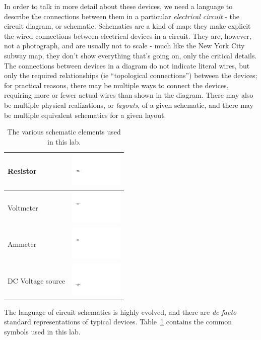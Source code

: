 \documentclass[12pt]{article}
\begin{document}
In order to talk in more detail about these devices, we need a
language to describe the connections between them in a particular
\textit{electrical circuit} - the circuit diagram, or schematic.
Schematics are a kind of map: they make explicit the wired connections
between electrical devices in a circuit.  They are, however, not a
photograph, and are usually not to scale - much like the New York City
subway map, they don't show everything that's going on, only the
critical details.  The connections between devices in a diagram do not
indicate literal wires, but only the required relationships (ie
``topological connections'') between the devices; for practical
reasons, there may be multiple ways to connect the devices, requiring
more or fewer actual wires than shown in the diagram.  There may also
be multiple physical realizations, or \textit{layouts}, of a given
schematic, and there may be multiple equivalent schematics for a given
layout.

\begin{table}
  \centering
  \begin{tabular}{|l|c|}\hline
    Resistor & \includegraphics[width=1in]{figures/resistor}\\ \hline
    Voltmeter & \includegraphics[width=1in]{figures/voltmeter}\\ \hline
    Ammeter & \includegraphics[width=1in]{figures/ammeter} \\ \hline
    DC Voltage source & \includegraphics[width=1in]{figures/dc_supply}\\ \hline
  \end{tabular}
  \caption{The various schematic elements used in this lab.}
  \label{tab:schematic}
\end{table}
The language of circuit schematics is highly evolved, and there are
\textit{de facto} standard representations of typical devices.
Table~\ref{tab:schematic} contains the common symbols used in this
lab.
\end{document}
